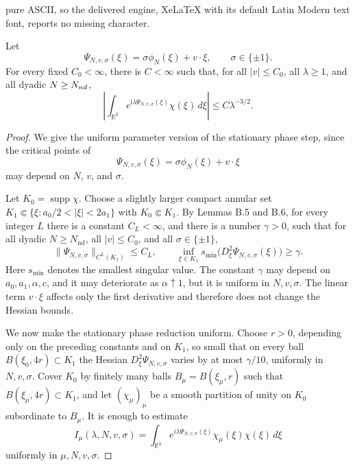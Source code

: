 \documentclass[10pt,a4paper]{amsart}
\newcommand{\ii}{\mathrm{i}}
\begin{document}
pure ASCII, so the delivered engine, XeLaTeX with its default Latin Modern text font, reports no missing character.
\begin{lemma}\label{lem:fracKG-stationary-phase}
Let
\[
        \Psi_{N,v,\sigma}(\xi)=\sigma\phi_N(\xi)+v\cdot\xi,
        \qquad \sigma\in\{\pm1\}.
\]
For every fixed $C_0<\infty$, there is $C<\infty$ such that, for all $|v|\le C_0$, all $\lambda\ge1$, and all dyadic $N\ge N_{\rm nd}$,
\[
        \left|\int_{\mathbb R^3}e^{\ii\lambda\Psi_{N,v,\sigma}(\xi)}\chi(\xi)\,d\xi\right|
        \le C\lambda^{-3/2}.
\]
\end{lemma}

\begin{proof}

We give the uniform parameter version of the stationary phase step,
since the critical points of
\[
        \Psi_{N,v,\sigma}(\xi)=\sigma\phi_N(\xi)+v\cdot \xi
\]
may depend on \(N\), \(v\), and \(\sigma\).

Let \(K_0=\operatorname{supp}\chi\). Choose a slightly larger compact annular set
\(K_1\Subset\{\xi: a_0/2<|\xi|<2a_1\}\) with \(K_0\Subset K_1\).
By Lemmas B.5 and B.6, for every integer \(L\) there is a constant
\(C_L<\infty\), and there is a number \(\gamma>0\), such that for all
dyadic \(N\ge N_{\mathrm{nd}}\), all \(|v|\le C_0\), and all
\(\sigma\in\{\pm1\}\),
\[
   \|\Psi_{N,v,\sigma}\|_{C^L(K_1)}\le C_L,
   \qquad
   \inf_{\xi\in K_1} s_{\min}\big(D_\xi^2\Psi_{N,v,\sigma}(\xi)\big)
   \ge \gamma .
\]
Here \(s_{\min}\) denotes the smallest singular value. The constant
\(\gamma\) may depend on \(a_0,a_1,\alpha,c\), and it may deteriorate
as \(\alpha\uparrow1\), but it is uniform in \(N,v,\sigma\). The linear
term \(v\cdot\xi\) affects only the first derivative and therefore does
not change the Hessian bounds.

We now make the stationary phase reduction uniform. Choose \(r>0\),
depending only on the preceding constants and on \(K_1\), so small that
on every ball \(B(\xi_0,4r)\subset K_1\) the Hessian
\(D_\xi^2\Psi_{N,v,\sigma}\) varies by at most \(\gamma/10\), uniformly
in \(N,v,\sigma\). Cover \(K_0\) by finitely many balls
\(B_\mu=B(\xi_\mu,r)\) such that \(B(\xi_\mu,4r)\subset K_1\), and let
\((\chi_\mu)_\mu\) be a smooth partition of unity on \(K_0\) subordinate
to \(B_\mu\). It is enough to estimate
\[
   I_\mu(\lambda,N,v,\sigma)
   =
   \int_{\mathbb R^3}
       e^{i\lambda\Psi_{N,v,\sigma}(\xi)}
       \chi_\mu(\xi)\chi(\xi)\,d\xi
\]
uniformly in \(\mu,N,v,\sigma\).


\end{proof}
\end{document}
